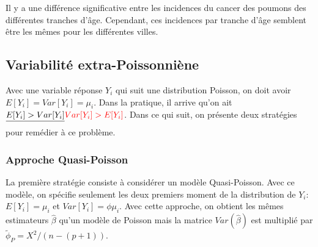 \documentclass[11pt]{article}
\begin{document}
\noindent Il y a une diff\'erence significative entre les incidences du cancer des poumons des diff\'erentes tranches d'\^age. Cependant, ces incidences par tranche d'\^age 
 semblent \^etre les m\^emes pour les diff\'erentes villes.
 
\subsection{Variabilit\'e extra-Poissonni\`ene}

Avec une variable r\'eponse $Y_i$ qui suit une distribution Poisson, on doit avoir $E[Y_i]=Var[Y_i]=\mu_i$. Dans la pratique, il arrive qu'on ait $\sout{E[Y_i]>Var[Y_i]}\textcolor{red}{Var[Y_i]>E[Y_i]}$. Dans ce qui suit, on pr\'esente deux strat\'egies pour rem\'edier \`a ce probl\`eme. 

\subsubsection{Approche Quasi-Poisson} La premi\`ere strat\'egie consiste \`a consid\'erer un mod\`ele Quasi-Poisson. Avec ce mod\`ele, on sp\'ecifie seulement les deux premiers moment de la distribution de $Y_i$: $E[Y_i]=\mu_i$ et $Var[Y_i]=\phi \mu_i$. Avec cette approche, on obtient les m\^emes estimateurs $\hat\beta$ qu'un mod\`ele de Poisson mais la matrice $Var(\hat\beta)$ est multipli\'e par $\tilde \phi_P=X^2/(n-(p+1))$.
\end{document}
